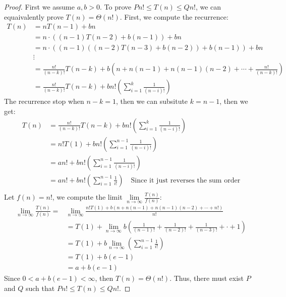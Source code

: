 \documentclass[12pt]{article}
\begin{document}
\begin{proof}
	First we assume $a,b>0$. To prove $Pn!\le T(n)\le Qn!$, we can equaivalently prove $T(n)=\Theta(n!)$. First, we compute the recurrence:\\
			\begin{align*}
				T(n)&=nT(n-1)+bn\\
				&=n\cdot((n-1)T(n-2)+b(n-1))+bn\\
				&=n\cdot((n-1)((n-2)T(n-3)+b(n-2))+b(n-1))+bn\\
				&\vdots\\
				&=\frac{n!}{(n-k)!}T(n-k)+b(n+n(n-1)+n(n-1)(n-2)+\cdots+\frac{n!}{(n-k)!})\\
				&=\frac{n!}{(n-k)!}T(n-k)+bn!(\sum_{i=1}^{k}\frac{1}{(n-i)!})
			\end{align*}
	The recurrence stop when $n-k=1$, then we can subsitute $k=n-1$, then we get:
	\begin{align*}
		T(n)&=\frac{n!}{(n-k)!}T(n-k)+bn!(\sum_{i=1}^{k}\frac{1}{(n-i)!})\\
		&=n!T(1)+bn!(\sum_{i=1}^{n-1}\frac{1}{(n-i)!})\\
		&=an!+bn!(\sum_{i=1}^{n-1}\frac{1}{(n-i)!})\\
		&=an!+bn!(\sum_{i=1}^{n-1}\frac{1}{i!})\quad\text{Since it just reverses the sum order}\\
	\end{align*}
	Let $f(n)=n!$, we compute the limit $\lim\limits_{n\to\infty}\frac{T(n)}{f(n)}$:
	\begin{align*}
		\lim\limits_{n\to\infty}\frac{T(n)}{f(n)}=&\lim\limits_{n\to\infty}\frac{n!T(1)+b(n+n(n-1)+n(n-1)(n-2)+\cdots+n!)}{n!}\\
		&=T(1)+\lim\limits_{n\to\infty}b(\frac{1}{(n-1)!}+\frac{1}{(n-2)!}+\frac{1}{(n-3)!}+\cdot+1)\\
		&=T(1)+b\lim\limits_{n\to\infty}(\sum_{i=1}^{n-1}\frac{1}{i!})\\
		&=T(1)+b(e-1)\\
		&=a+b(e-1)
	\end{align*}
	Since $0<a+b(e-1)<\infty$, then $T(n)=\Theta(n!)$. Thus, there must exist $P$ and $Q$ such that $Pn!\le T(n)\le Qn!$.
\end{proof}



\bigskip


\begin{thebibliography}{}
\end{thebibliography}
\end{document}

